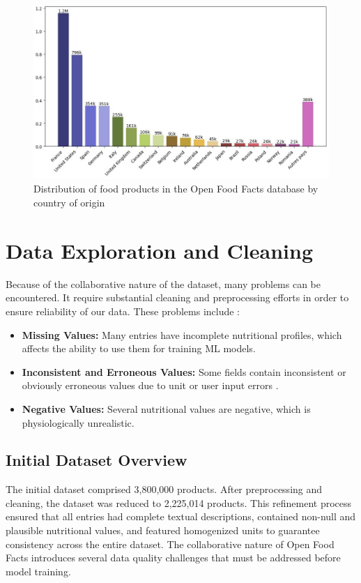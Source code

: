 \begin{figure}[H]
\centering
\includegraphics[scale=0.52]{images/OFF_database.png}
\caption{Distribution of food products in the Open Food Facts database by country of origin} 
\label{fig:country_distribution}
\end{figure}

\section{Data Exploration and Cleaning}
Because of the collaborative nature of the dataset, many problems can be encountered. It require substantial cleaning and preprocessing efforts in order to ensure reliability of our data.
These problems include :

\begin{itemize}[label=\textbf{-}]
\item \textbf{Missing Values:} Many entries have incomplete nutritional profiles, which affects the ability to use them for training ML models.
\item \textbf{Inconsistent and Erroneous Values:} Some fields contain inconsistent or obviously erroneous values due to unit or user input errors .
\item \textbf{Negative Values:} Several nutritional values are negative, which is physiologically unrealistic.
\end{itemize}


\subsection{Initial Dataset Overview}
The initial dataset comprised 3,800,000 products. After preprocessing and cleaning, the dataset was reduced to 2,225,014 products.
This refinement process ensured that all entries had complete textual descriptions, contained non-null and plausible nutritional values, and featured homogenized units to guarantee consistency across the entire dataset.
The collaborative nature of Open Food Facts introduces several data quality challenges that must be addressed before model training.

